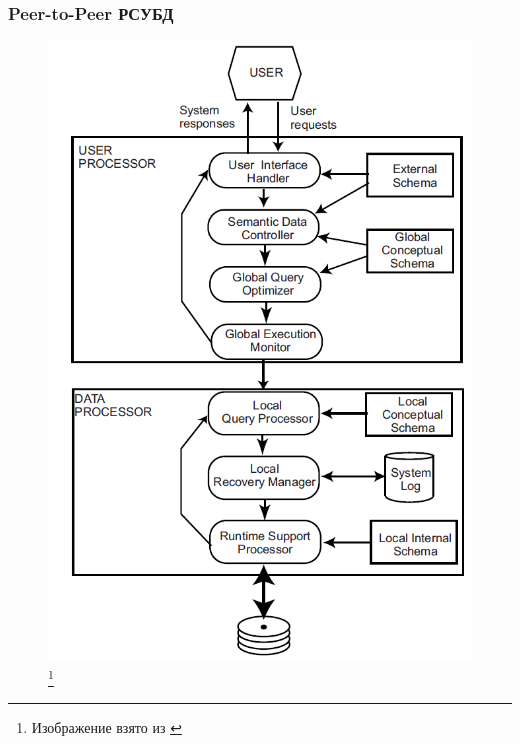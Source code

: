 \documentclass{beamer}
\begin{document}
\begin{frame}
\frametitle{Peer-to-Peer РСУБД}

\begin{figure}[htb]
\includegraphics[width=\textwidth,height=0.80\textheight,keepaspectratio]{ozsu-5.png} 
\footnote{\tiny{Изображение взято из \cite{Ozsu2011}}}
\end{figure}

\end{frame}
\end{document}
